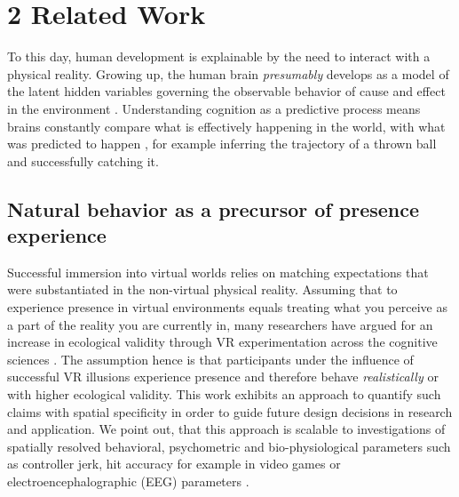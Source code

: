 \section{2 Related Work}
To this day, human development is explainable by the need to interact with a physical reality. Growing up, the human brain \textit{presumably} develops as a model of the latent hidden variables governing the observable behavior of cause and effect in the environment \cite{Friston2010}. Understanding cognition as a predictive process means brains constantly compare what is effectively happening in the world, with what was predicted to happen \cite{Clark2013}, for example inferring the trajectory of a thrown ball and successfully catching it.

\subsection{Natural behavior as a precursor of presence experience}
Successful immersion into virtual worlds relies on matching expectations that were substantiated in the non-virtual physical reality. Assuming that to experience presence in virtual environments equals treating what you perceive as a part of the reality you are currently in, many researchers have argued for an increase in ecological validity through VR experimentation across the cognitive sciences \cite{Bohil2011, Parsons2015, Parsons2017}. The assumption hence is that participants under the influence of successful VR illusions experience presence and therefore behave \textit{realistically} or with higher ecological validity. This work exhibits an approach to quantify such claims with spatial specificity in order to guide future design decisions in research and application. We point out, that this approach is scalable to investigations of spatially resolved behavioral, psychometric and bio-physiological parameters such as controller jerk, hit accuracy for example in video games or electroencephalographic (EEG) parameters \cite{Gehrke2019}.

